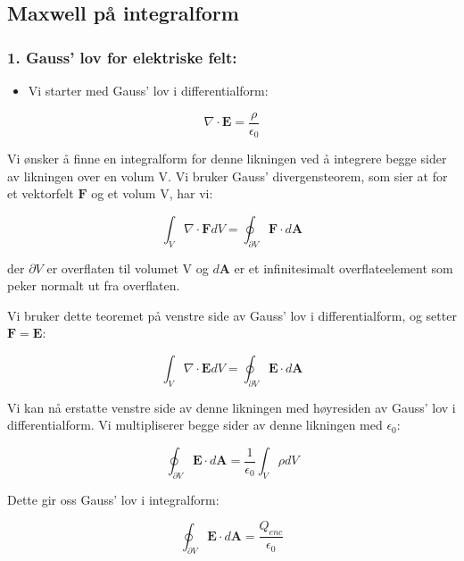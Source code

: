 \subsection*{Maxwell på integralform}
\subsubsection*{1. Gauss' lov for elektriske felt:}
\begin{itemize}
    \item Vi starter med Gauss' lov i differentialform:
\end{itemize}

\begin{equation*}
    \nabla \cdot \mathbf{E}=\frac{\rho}{\epsilon_0}
\end{equation*}

Vi ønsker å finne en integralform for denne likningen ved å integrere begge sider av likningen over en volum V. Vi bruker Gauss' divergensteorem, som sier at for et vektorfelt $\mathbf{F}$ og et volum V, har vi:

\begin{equation*}
     \int_{V} \nabla \cdot \mathbf{F} d V=\oint_{\partial V} \mathbf{F} \cdot d \mathbf{A} 
\end{equation*}

der $\partial V$ er overflaten til volumet V og $d\mathbf{A}$ er et infinitesimalt overflateelement som peker normalt ut fra overflaten.

Vi bruker dette teoremet på venstre side av Gauss' lov i differentialform, og setter $\mathbf{F} = \mathbf{E}$:

\begin{equation*}
    \int_{V} \nabla \cdot \mathbf{E} d V=\oint_{\partial V} \mathbf{E} \cdot d \mathbf{A} 
\end{equation*}

Vi kan nå erstatte venstre side av denne likningen med høyresiden av Gauss' lov i differentialform. Vi multipliserer begge sider av denne likningen med $\epsilon_0$:

\begin{equation*}
     \oint_{\partial V} \mathbf{E} \cdot d \mathbf{A}=\frac{1}{\epsilon_{0}} \int_{V} \rho d V 
\end{equation*}

Dette gir oss Gauss' lov i integralform:

\begin{equation*}
    \oint_{\partial V} \mathbf{E} \cdot d\mathbf{A} = \frac{Q_{enc}}{\epsilon_0}
\end{equation*}

